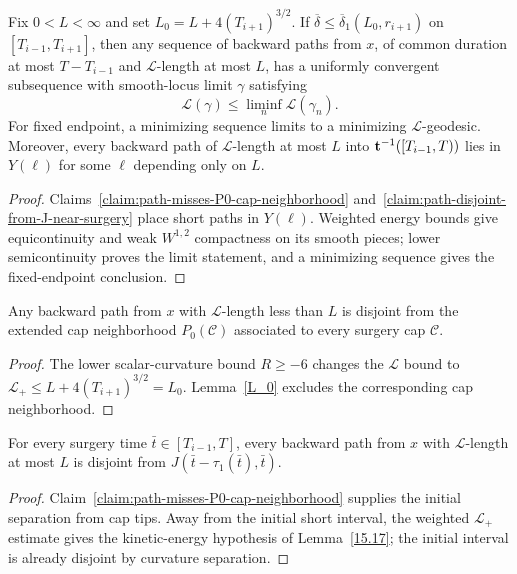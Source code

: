 \begin{proposition}
\label{prop:L-geodesics-exist-and-limit}
\label{Lgeoexist}
Fix $0<L<\infty$ and set $L_0=L+4(T_{i+1})^{3/2}$. If $\overline\delta\leq\overline\delta_1(L_0,r_{i+1})$ on $[T_{i-1},T_{i+1}]$, then any sequence of backward paths from $x$, of common duration at most $T-T_{i-1}$ and $\mathcal L$-length at most $L$, has a uniformly convergent subsequence with smooth-locus limit $\gamma$ satisfying
\[
\mathcal L(\gamma)\leq\liminf_n\mathcal L(\gamma_n).
\]
For fixed endpoint, a minimizing sequence limits to a minimizing $\mathcal L$-geodesic. Moreover, every backward path of $\mathcal L$-length at most $L$ into ${\bf t}^{-1}([T_{i-1},T))$ lies in $Y(\ell)$ for some $\ell$ depending only on $L$.
\end{proposition}
\label{L'ineq}\label{gamliminf1}\label{gamliminf2}
\begin{proof}
\sketch
{}
Claims~\ref{claim:path-misses-P0-cap-neighborhood} and~\ref{claim:path-disjoint-from-J-near-surgery} place short paths in $Y(\ell)$. Weighted energy bounds give equicontinuity and weak $W^{1,2}$ compactness on its smooth pieces; lower semicontinuity proves the limit statement, and a minimizing sequence gives the fixed-endpoint conclusion.
\end{proof}

\begin{claim}
\label{claim:path-misses-P0-cap-neighborhood}
Any backward path from $x$ with $\mathcal L$-length less than $L$ is disjoint from the extended cap neighborhood $P_0(\mathcal C)$ associated to every surgery cap $\mathcal C$.
\end{claim}
\begin{proof}
\sketch
{}
The lower scalar-curvature bound $R\geq-6$ changes the $\mathcal L$ bound to $\mathcal L_+\leq L+4(T_{i+1})^{3/2}=L_0$. Lemma~\ref{L_0} excludes the corresponding cap neighborhood.
\end{proof}

\begin{claim}
\label{claim:path-disjoint-from-J-near-surgery}
For every surgery time $\bar t\in[T_{i-1},T]$, every backward path from $x$ with $\mathcal L$-length at most $L$ is disjoint from $J(\bar t-\tau_1(\bar t),\bar t)$.
\end{claim}
\begin{proof}
\sketch
{}
Claim~\ref{claim:path-misses-P0-cap-neighborhood} supplies the initial separation from cap tips. Away from the initial short interval, the weighted $\mathcal L_+$ estimate gives the kinetic-energy hypothesis of Lemma~\ref{15.17}; the initial interval is already disjoint by curvature separation.
\end{proof}

